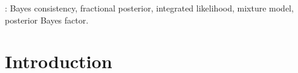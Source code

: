 \documentclass[11pt]{article}
\theoremstyle{plain}
\theoremstyle{definition}
\theoremstyle{remark}
\begin{document}
:
Bayes consistency,
fractional posterior,
integrated likelihood,
mixture model,
posterior Bayes factor.











\section{Introduction}









\end{document}
